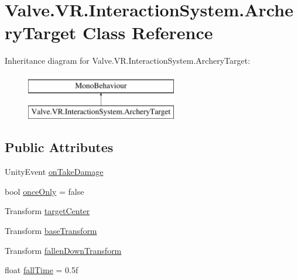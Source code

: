 \hypertarget{class_valve_1_1_v_r_1_1_interaction_system_1_1_archery_target}{}\section{Valve.\+V\+R.\+Interaction\+System.\+Archery\+Target Class Reference}
\label{class_valve_1_1_v_r_1_1_interaction_system_1_1_archery_target}
Inheritance diagram for Valve.\+V\+R.\+Interaction\+System.\+Archery\+Target\+:\begin{figure}[H]
\begin{center}
\leavevmode
\includegraphics[height=2.000000cm]{class_valve_1_1_v_r_1_1_interaction_system_1_1_archery_target}
\end{center}
\end{figure}
\subsection*{Public Attributes}
\begin{DoxyCompactItemize}
\item 
Unity\+Event \mbox{\hyperlink{class_valve_1_1_v_r_1_1_interaction_system_1_1_archery_target_a378e44118f64f4da57412fa190ab88cd}{on\+Take\+Damage}}
\item 
bool \mbox{\hyperlink{class_valve_1_1_v_r_1_1_interaction_system_1_1_archery_target_af9b043b5f509535a167b6bdc5dc368cf}{once\+Only}} = false
\item 
Transform \mbox{\hyperlink{class_valve_1_1_v_r_1_1_interaction_system_1_1_archery_target_ad68814d99b461f7b7c3aaa68d79383f9}{target\+Center}}
\item 
Transform \mbox{\hyperlink{class_valve_1_1_v_r_1_1_interaction_system_1_1_archery_target_a54cffbc0b56ec32c29bd68169fcc3949}{base\+Transform}}
\item 
Transform \mbox{\hyperlink{class_valve_1_1_v_r_1_1_interaction_system_1_1_archery_target_aa4e8a4a8d75147b1c0e1570492af29ff}{fallen\+Down\+Transform}}
\item 
float \mbox{\hyperlink{class_valve_1_1_v_r_1_1_interaction_system_1_1_archery_target_afdf6439229b24f305d2ec88eb83c459e}{fall\+Time}} = 0.\+5f
\end{DoxyCompactItemize}


